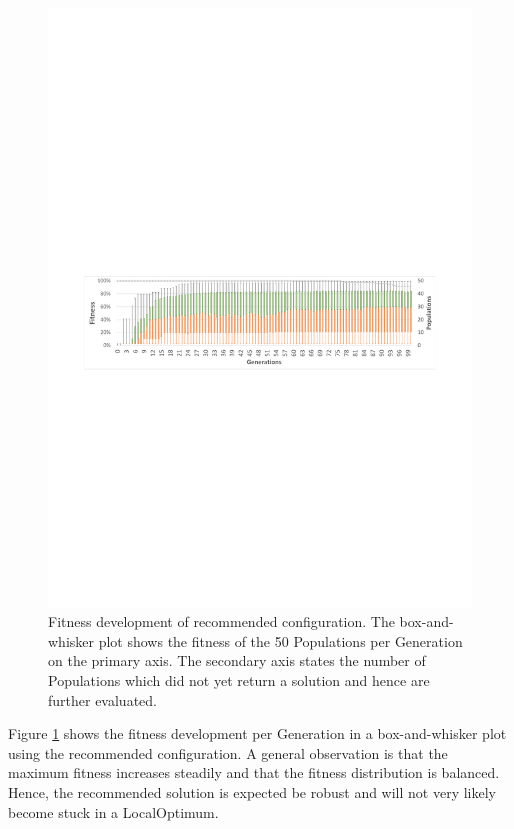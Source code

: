 \begin{figure}[!ht]
	\centering
	\includegraphics[scale=0.8, trim=1.5cm 11.5cm 1.5cm 13cm, clip=true]{Images/ConfigurationComparison_BestWithOperatorOption.pdf} 
	\caption{Fitness development of recommended configuration. The box-and-whisker plot shows the fitness of the 50 \glspl{Population} per \gls{Generation} on the primary axis. The secondary axis states the number of \glspl{Population} which did not yet return a solution and hence are further evaluated.}
	\label{figConfigurationComparison_BestWithOperatorOption}
\end{figure}

Figure \ref{figConfigurationComparison_BestWithOperatorOption} shows the fitness development per \gls{Generation} in a box-and-whisker plot using the recommended configuration. A general observation is that the maximum fitness increases steadily and that the fitness distribution is balanced. Hence, the recommended solution is expected be robust and will not very likely become stuck in a \gls{LocalOptimum}.

